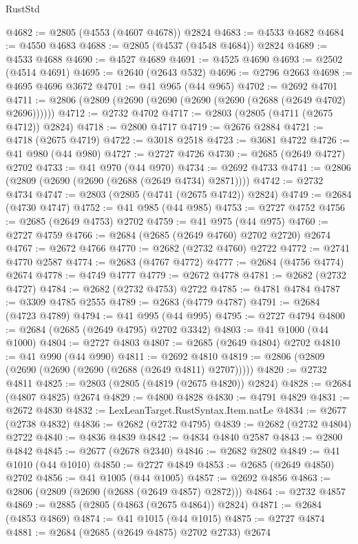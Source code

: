 \begin{lexlean}{RustStd}
\begin{coremodule}
@4682 := @2805 (@4553 (@4607 @4678)) @2824
@4683 := @4533 @4682
@4684 := @4550 @4683
@4688 := @2805 (@4537 (@4548 @4684)) @2824
@4689 := @4533 @4688
@4690 := @4527 @4689
@4691 := @4525 @4690
@4693 := @2502 (@4514 @4691)
@4695 := @2640 (@2643 @532)
@4696 := @2796 @2663
@4698 := @4695 @4696 @3672
@4701 := @41 @965 (@44 @965)
@4702 := @2692 @4701
@4711 := @2806 (@2809 (@2690 (@2690 (@2690 (@2690 (@2688 (@2649 @4702) @2696))))))
@4712 := @2732 @4702
@4717 := @2803 (@2805 (@4711 (@2675 @4712)) @2824)
@4718 := @2800 @4717
@4719 := @2676 @2884
@4721 := @4718 (@2675 @4719)
@4722 := @3018 @2518
@4723 := @3681 @4722
@4726 := @41 @980 (@44 @980)
@4727 := @2727 @4726
@4730 := @2685 (@2649 @4727) @2702
@4733 := @41 @970 (@44 @970)
@4734 := @2692 @4733
@4741 := @2806 (@2809 (@2690 (@2690 (@2688 (@2649 @4734) @2871))))
@4742 := @2732 @4734
@4747 := @2803 (@2805 (@4741 (@2675 @4742)) @2824)
@4749 := @2684 (@4730 @4747)
@4752 := @41 @985 (@44 @985)
@4753 := @2727 @4752
@4756 := @2685 (@2649 @4753) @2702
@4759 := @41 @975 (@44 @975)
@4760 := @2727 @4759
@4766 := @2684 (@2685 (@2649 @4760) @2702 @2720) @2674
@4767 := @2672 @4766
@4770 := @2682 (@2732 @4760) @2722
@4772 := @2741 @4770 @2587
@4774 := @2683 (@4767 @4772)
@4777 := @2684 (@4756 @4774) @2674
@4778 := @4749 @4777
@4779 := @2672 @4778
@4781 := @2682 (@2732 @4727)
@4784 := @2682 (@2732 @4753) @2722
@4785 := @4781 @4784
@4787 := @3309 @4785 @2555
@4789 := @2683 (@4779 @4787)
@4791 := @2684 (@4723 @4789)
@4794 := @41 @995 (@44 @995)
@4795 := @2727 @4794
@4800 := @2684 (@2685 (@2649 @4795) @2702 @3342)
@4803 := @41 @1000 (@44 @1000)
@4804 := @2727 @4803
@4807 := @2685 (@2649 @4804) @2702
@4810 := @41 @990 (@44 @990)
@4811 := @2692 @4810
@4819 := @2806 (@2809 (@2690 (@2690 (@2690 (@2688 (@2649 @4811) @2707)))))
@4820 := @2732 @4811
@4825 := @2803 (@2805 (@4819 (@2675 @4820)) @2824)
@4828 := @2684 (@4807 @4825) @2674
@4829 := @4800 @4828
@4830 := @4791 @4829
@4831 := @2672 @4830
@4832 := LexLeanTarget.RustSyntax.Item.natLe
@4834 := @2677 (@2738 @4832)
@4836 := @2682 (@2732 @4795)
@4839 := @2682 (@2732 @4804) @2722
@4840 := @4836 @4839
@4842 := @4834 @4840 @2587
@4843 := @2800 @4842
@4845 := @2677 (@2678 @2340)
@4846 := @2682 @2802
@4849 := @41 @1010 (@44 @1010)
@4850 := @2727 @4849
@4853 := @2685 (@2649 @4850) @2702
@4856 := @41 @1005 (@44 @1005)
@4857 := @2692 @4856
@4863 := @2806 (@2809 (@2690 (@2688 (@2649 @4857) @2872)))
@4864 := @2732 @4857
@4869 := @2885 (@2805 (@4863 (@2675 @4864)) @2824)
@4871 := @2684 (@4853 @4869)
@4874 := @41 @1015 (@44 @1015)
@4875 := @2727 @4874
@4881 := @2684 (@2685 (@2649 @4875) @2702 @2733) @2674

\end{coremodule}
\end{lexlean}
